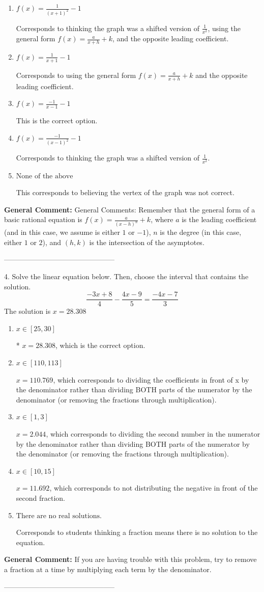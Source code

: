 \documentclass{extbook}[14pt]
\begin{document}
\begin{enumerate}[label=\Alph*.] 
\item $ f(x) = \frac{1}{(x + 1)^2} - 1 $ 

 Corresponds to thinking the graph was a shifted version of $\frac{1}{x^2}$, using the general form $f(x) = \frac{a}{x+h}+k$, and the opposite leading coefficient. 
\item $ f(x) = \frac{1}{x + 1} - 1 $ 

 Corresponds to using the general form $f(x) = \frac{a}{x+h}+k$ and the opposite leading coefficient. 
\item $ f(x) = \frac{-1}{x - 1} - 1 $ 

 This is the correct option. 
\item $ f(x) = \frac{-1}{(x - 1)^2} - 1 $ 

 Corresponds to thinking the graph was a shifted version of $\frac{1}{x^2}$. 
\item $ \text{None of the above} $ 

 This corresponds to believing the vertex of the graph was not correct. 
\end{enumerate} 
 
\textbf{General Comment:} General Comments: Remember that the general form of a basic rational equation is $ f(x) = \frac{a}{(x-h)^n} + k$, where $a$ is the leading coefficient (and in this case, we assume is either $1$ or $-1$), $n$ is the degree (in this case, either $1$ or $2$), and $(h, k)$ is the intersection of the asymptotes. 

-----------------------------------------------

4. Solve the linear equation below. Then, choose the interval that contains the solution.
\[ \frac{-3x + 8}{4} - \frac{4x -9}{5} = \frac{-4x -7}{3} \] 
The solution is $ x = 28.308 $ 

\begin{enumerate}[label=\Alph*.] 
\item $ x \in [25, 30] $ 

 * $x = 28.308$, which is the correct option. 
\item $ x \in [110, 113] $ 

  $x = 110.769$, which corresponds to dividing the coefficients in front of x by the denominator rather than dividing BOTH parts of the numerator by the denominator (or removing the fractions through multiplication). 
\item $ x \in [1, 3] $ 

  $x = 2.044$, which corresponds to dividing the second number in the numerator by the denominator rather than dividing BOTH parts of the numerator by the denominator (or removing the fractions through multiplication). 
\item $ x \in [10, 15] $ 

  $x = 11.692$, which corresponds to not distributing the negative in front of the second fraction. 
\item $ \text{There are no real solutions.} $ 

 Corresponds to students thinking a fraction means there is no solution to the equation. 
\end{enumerate} 
 
\textbf{General Comment:} If you are having trouble with this problem, try to remove a fraction at a time by multiplying each term by the denominator. 

-----------------------------------------------
\end{document}
